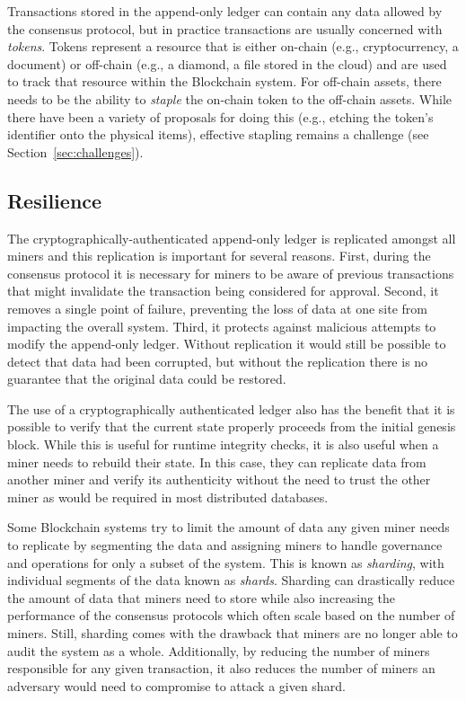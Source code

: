 Transactions stored in the append-only ledger can contain any data allowed by the consensus protocol, but in practice transactions are usually concerned with \emph{tokens}.
Tokens represent a resource that is either on-chain (e.g., cryptocurrency, a document) or off-chain (e.g., a diamond, a file stored in the cloud) and are used to track that resource within the Blockchain system.
For off-chain assets, there needs to be the ability to \emph{staple} the on-chain token to the off-chain assets.
While there have been a variety of proposals for doing this (e.g., etching the token's identifier onto the physical items), effective stapling remains a challenge (see Section~\ref{sec:challenges}).

\subsection{Resilience}
The cryptographically-authenticated append-only ledger is replicated amongst all miners and this replication is important for several reasons.
First, during the consensus protocol it is necessary for miners to be aware of previous transactions that might invalidate the transaction being considered for approval.
Second, it removes a single point of failure, preventing the loss of data at one site from impacting the overall system.
Third, it protects against malicious attempts to modify the append-only ledger.
Without replication it would still be possible to detect that data had been corrupted, but without the replication there is no guarantee that the original data could be restored.

The use of a cryptographically authenticated ledger also has the benefit that it is possible to verify that the current state properly proceeds from the initial genesis block.
While this is useful for runtime integrity checks, it is also useful when a miner needs to rebuild their state.
In this case, they can replicate data from another miner and verify its authenticity without the need to trust the other miner as would be required in most distributed databases.

Some Blockchain systems try to limit the amount of data any given miner needs to replicate by segmenting the data and assigning miners to handle governance and operations for only a subset of the system.
This is known as \emph{sharding}, with individual segments of the data known as \emph{shards}.
Sharding can drastically reduce the amount of data that miners need to store while also increasing the performance of the consensus protocols which often scale based on the number of miners.
Still, sharding comes with the drawback that miners are no longer able to audit the system as a whole.
Additionally, by reducing the number of miners responsible for any given transaction, it also reduces the number of miners an adversary would need to compromise to attack a given shard.

